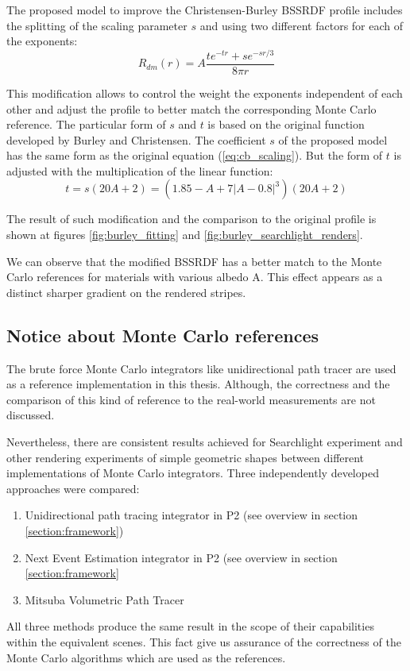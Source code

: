 The proposed model to improve the Christensen-Burley BSSRDF profile includes the splitting of the
scaling parameter $s$ and using two different factors for each of the exponents:
\begin{equation}
\label{eq:burley_modified}
R_{dm}(r) = A\dfrac{te^{-tr}+se^{-sr/3}}{8\pi r}
\end{equation}

This modification allows to control the weight the exponents independent of each other and adjust
the profile to better match the corresponding Monte Carlo reference. The particular form of $s$ and
$t$ is based on the original function developed by Burley and Christensen. The coefficient $s$ of
the proposed model has the same form as the original equation (\ref{eq:cb_scaling}). But the form of
$t$ is adjusted with the multiplication of the linear function:
\begin{equation}
\label{eq:cb_scaling_modified}
t=s(20A+2)=(1.85-A + 7|A - 0.8|^3)(20A+2)
\end{equation}

The result of such modification and the comparison to the original profile is shown at figures
\ref{fig:burley_fitting} and \ref{fig:burley_searchlight_renders}.

We can observe that the modified BSSRDF has a better match to the Monte Carlo references for
materials with various albedo A. This effect appears as a distinct sharper gradient on the rendered
stripes.

\subsection{Notice about Monte Carlo references}
The brute force Monte Carlo integrators like unidirectional path tracer are used as a reference
implementation in this thesis. Although, the correctness and the comparison of this kind of
reference to the real-world measurements are not discussed.

Nevertheless, there are consistent results achieved for Searchlight experiment and other rendering
experiments of simple geometric shapes between different implementations of Monte Carlo integrators.
Three independently developed approaches were compared:
\begin{enumerate}
  \item Unidirectional path tracing integrator in P2 (see overview in section
  \ref{section:framework})
  \item Next Event Estimation integrator in P2 (see overview in section \ref{section:framework}
  \item Mitsuba Volumetric Path Tracer \cite{Mitsuba}
\end{enumerate}

All three methods produce the same result in the scope of their capabilities within the equivalent
scenes. This fact give us assurance of the correctness of the Monte Carlo algorithms which are
used as the references.
